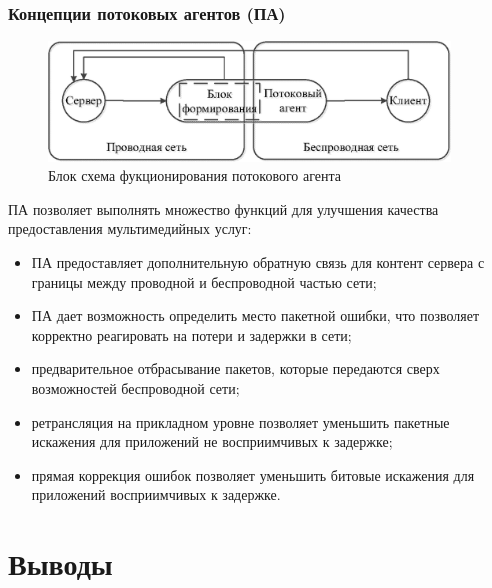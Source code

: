 \documentclass[10pt,pdf,hyperref={unicode}]{beamer}
\begin{document}
\begin{frame}
\frametitle{Концепции потоковых агентов (ПА)}

\begin{figure} [h]
  \center
\includegraphics [width=0.95\textwidth] {SA.eps}
  \caption*{Блок схема фукционирования потокового агента}
  \label{img:SA}
\end{figure}

\begin{scriptsize}
ПА позволяет выполнять множество функций для улучшения качества предоставления мультимедийных услуг:
\begin{itemize}
\item ПА предоставляет дополнительную обратную связь для контент сервера с границы между проводной  и беспроводной частью сети;
\item ПА дает возможность определить место пакетной ошибки, что позволяет корректно реагировать на потери и задержки в сети;
\item предварительное отбрасывание пакетов, которые передаются сверх возможностей беспроводной сети;
\item ретрансляция на прикладном уровне позволяет уменьшить  пакетные искажения  для приложений не восприимчивых к задержке;
\item прямая коррекция ошибок позволяет уменьшить битовые искажения для приложений восприимчивых к задержке.
\end{itemize}
\end{scriptsize}
\end{frame}

\section{Выводы}
\end{document}
